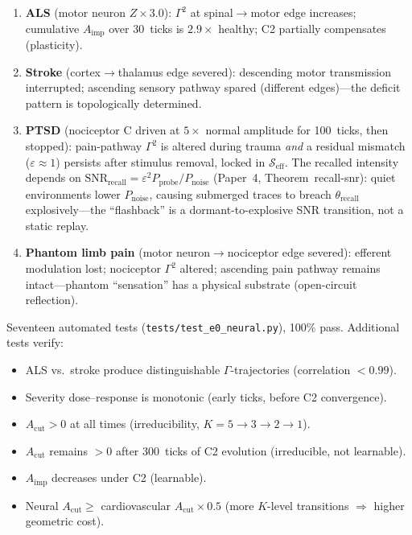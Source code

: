 \documentclass[aps,pre,twocolumn,superscriptaddress,floatfix]{revtex4-2}
\newcommand{\Aimp}{A_{\text{imp}}}
\newcommand{\Acut}{A_{\text{cut}}}
\begin{document}
\begin{enumerate}
  \item \textbf{ALS} (motor neuron $Z \times 3.0$):
    $\Gamma^2$ at spinal$\to$motor edge increases;
    cumulative $\Aimp$ over 30~ticks is $2.9\times$ healthy;
    C2 partially compensates (plasticity).
  \item \textbf{Stroke} (cortex$\to$thalamus edge severed):
    descending motor transmission interrupted; ascending
    sensory pathway spared (different edges)---the deficit
    pattern is topologically determined.
  \item \textbf{PTSD} (nociceptor C driven at $5\times$
    normal amplitude for 100~ticks, then stopped):
    pain-pathway $\Gamma^2$ is altered during trauma
    \emph{and} a residual mismatch ($\varepsilon \approx 1$)
    persists after stimulus removal, locked in
    $\mathcal{S}_{\text{eff}}$.
    The recalled intensity depends on
    $\mathrm{SNR}_{\text{recall}} =
    \varepsilon^2 P_{\text{probe}} / P_{\text{noise}}$
    (Paper~4, Theorem~recall-snr):
    quiet environments lower $P_{\text{noise}}$,
    causing submerged traces to breach
    $\theta_{\text{recall}}$ explosively---the
    ``flashback'' is a dormant-to-explosive
    SNR transition, not a static replay.
  \item \textbf{Phantom limb pain}
    (motor neuron$\to$nociceptor edge severed):
    efferent modulation lost; nociceptor $\Gamma^2$ altered;
    ascending pain pathway remains intact---phantom
    ``sensation'' has a physical substrate
    (open-circuit reflection).
\end{enumerate}

\noindent
Seventeen automated tests
(\texttt{tests/test\_e0\_neural.py}), 100\% pass.
Additional tests verify:
\begin{itemize}
  \item ALS vs.\ stroke produce distinguishable
    $\Gamma$-trajectories (correlation $< 0.99$).
  \item Severity dose--response is monotonic (early ticks,
    before C2 convergence).
  \item $\Acut > 0$ at all times (irreducibility,
    $K{=}5 \to 3 \to 2 \to 1$).
  \item $\Acut$ remains $> 0$ after 300~ticks of C2 evolution
    (irreducible, not learnable).
  \item $\Aimp$ decreases under C2 (learnable).
  \item Neural $\Acut \geq$ cardiovascular $\Acut \times 0.5$
    (more $K$-level transitions $\Rightarrow$ higher
    geometric cost).
\end{itemize}
\end{document}
